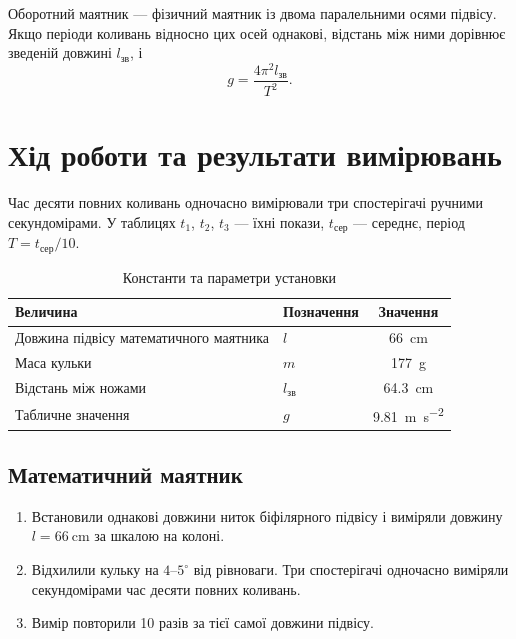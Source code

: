 \documentclass[ukrainian]{ucaphyslab}
\begin{document}
Оборотний маятник — фізичний маятник із двома паралельними осями підвісу. Якщо періоди коливань відносно цих осей однакові, відстань між ними дорівнює зведеній довжині \(l_{\text{зв}}\), і
\begin{equation}
  g = \frac{4\pi^{2} l_{\text{зв}}}{T^{2}}.
  \tag{2.33б}
  \label{eq:g-phys}
\end{equation}
\section{Хід роботи та результати вимірювань}
Час десяти повних коливань одночасно вимірювали три спостерігачі ручними секундомірами.
У таблицях \(t_1\), \(t_2\), \(t_3\) — їхні покази, \(t_\text{сер}\) — середнє, період \(T = t_\text{сер}/10\).

\begin{table}[H]
  \centering
  \begin{tabular}{@{}llc@{}}
    \toprule
    Величина & Позначення & Значення \\
    \midrule
    Довжина підвісу математичного маятника & \(l\) & \SI{66}{\centi\meter} \\
    Маса кульки & \(m\) & \SI{177}{\gram} \\
    Відстань між ножами & \(l_{\text{зв}}\) & \SI{64.3}{\centi\meter} \\
    Табличне значення & \(g\) & \SI{9.81}{\meter\per\second\squared} \\
    \bottomrule
  \end{tabular}
  \caption{Константи та параметри установки}
  \label{tab:constants}
\end{table}

\subsection{Математичний маятник}
\begin{enumerate}
  \item Встановили однакові довжини ниток біфілярного підвісу і виміряли довжину \(l = \SI{66}{\centi\meter}\) за шкалою на колоні.
  \item Відхилили кульку на \(4\)--\(5^{\circ}\) від рівноваги. Три спостерігачі одночасно виміряли секундомірами час десяти повних коливань.
  \item Вимір повторили 10 разів за тієї самої довжини підвісу.
\end{enumerate}
\end{document}
